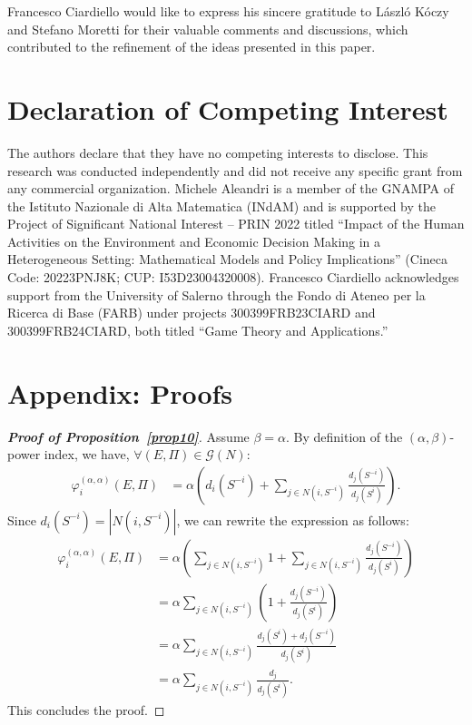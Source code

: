\documentclass[preprint,11pt,authoryear]{elsarticle}
\theoremstyle{plain}
\begin{document}
Francesco Ciardiello would like to express his sincere gratitude to  L\'{a}szl\'{o} K\'{o}czy 
and Stefano Moretti for their valuable comments and discussions, which contributed 
to the refinement of the ideas presented in this paper.


\section*{Declaration of Competing Interest}
The authors declare that they have no competing interests to disclose. This research was conducted independently and did not receive any specific grant from any commercial organization. Michele Aleandri is a member of the GNAMPA of the Istituto Nazionale di Alta Matematica (INdAM) and is supported by the Project of Significant National Interest – PRIN 2022 titled “Impact of the Human Activities on the Environment and Economic Decision Making in a Heterogeneous Setting: Mathematical Models and Policy Implications” (Cineca Code: 20223PNJ8K; CUP: I53D23004320008). Francesco Ciardiello acknowledges support from the University of Salerno through the Fondo di Ateneo per la Ricerca di Base (FARB) under projects 300399FRB23CIARD and 300399FRB24CIARD, both titled “Game Theory and Applications.”

\section*{Appendix: Proofs}\label{app:proofs1}



\begin{proof}[\bf Proof of Proposition~\ref{prop10}]
	Assume $\beta = \alpha$. By definition of the $(\alpha,\beta)$-power index, we have, $\forall (E,\Pi)\in\mathcal{G}(N)$:
	\begin{align*}
		\varphi_i^{(\alpha,\alpha)}(E,\Pi)
		&=  \alpha \left( d_i(S^{-i}) + \sum_{j \in N(i, S^{-i})} \frac{d_j(S^{-i})}{d_j(S^{i})} \right).
	\end{align*}
	Since $d_i(S^{-i}) = |N(i, S^{-i})|$, we can rewrite the expression as follows:
	\begin{align*}
		\varphi_i^{(\alpha,\alpha)}(E,\Pi)
		&= \alpha \left( \sum_{j \in N(i, S^{-i})} 1 + \sum_{j \in N(i, S^{-i})} \frac{d_j(S^{-i})}{d_j(S^{i})} \right) \\
		&= \alpha \sum_{j \in N(i, S^{-i})} \left( 1 + \frac{d_j(S^{-i})}{d_j(S^{i})} \right) \\
		&= \alpha \sum_{j \in N(i, S^{-i})} \frac{d_j(S^{i}) + d_j(S^{-i})}{d_j(S^{i})} \\
		&= \alpha \sum_{j \in N(i, S^{-i})} \frac{d_j}{d_j(S^{i})}.
	\end{align*}
	This concludes the proof.
\end{proof}
\end{document}

